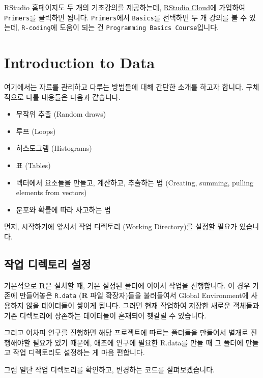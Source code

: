 \documentclass[]{book}
\providecommand{\tightlist}{%
  \setlength{\itemsep}{0pt}\setlength{\parskip}{0pt}}
\begin{document}
RStudio 홈페이지도 두 개의 기초강의를 제공하는데, \href{https://rstudio.cloud/}{RStudio Cloud}에 가입하여 \texttt{Primers}를 클릭하면 됩니다. \texttt{Primers}에서 \texttt{Basics}를 선택하면 두 개 강의를 볼 수 있는데, \texttt{R-coding}에 도움이 되는 건 \texttt{Programming\ Basics\ Course}입니다.

\hypertarget{ch3}{%
\chapter{Introduction to Data}\label{ch3}}

여기에서는 자료를 관리하고 다루는 방법들에 대해 간단한 소개를 하고자 합니다. 구체적으로 다룰 내용들은 다음과 같습니다.

\begin{itemize}
\tightlist
\item
  무작위 추출 (Random draws)
\item
  루프 (Loops)
\item
  히스토그램 (Histograms)
\item
  표 (Tables)
\item
  벡터에서 요소들을 만들고, 계산하고, 추출하는 법 (Creating, summing, pulling elements from vectors)
\item
  분포와 확률에 따라 사고하는 법
\end{itemize}

먼저, 시작하기에 앞서서 작업 디렉토리 (Working Directory)를 설정할 필요가 있습니다.

\hypertarget{uxc791uxc5c5-uxb514uxb809uxd1a0uxb9ac-uxc124uxc815}{%
\section{작업 디렉토리 설정}\label{uxc791uxc5c5-uxb514uxb809uxd1a0uxb9ac-uxc124uxc815}}

기본적으로 \textbf{R}은 설치할 때, 기본 설정된 폴더에 이어서 작업을 진행합니다. 이 경우 기존에 만들어놓은 \texttt{R.data} (\textbf{R} 파일 확장자)들을 불러들여서 Global Environment에 사용하지 않을 데이터들이 쌓이게 됩니다. 그러면 현재 작업하여 저장한 새로운 객체들과 기존 디렉토리에 상존하는 데이터들이 혼재되어 헷갈릴 수 있습니다.

그리고 어차피 연구를 진행하면 해당 프로젝트에 따르는 폴더들을 만들어서 별개로 진행해야할 필요가 있기 때문에, 애초에 연구에 필요한 R.data를 만들 때 그 폴더에 만들고 작업 디렉토리도 설정하는 게 마음 편합니다.

그럼 일단 작업 디렉토리를 확인하고, 변경하는 코드를 살펴보겠습니다.
\end{document}
